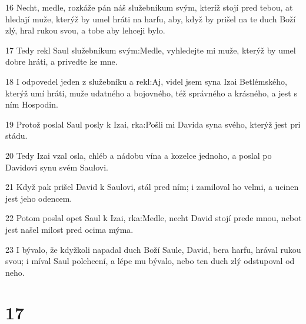 \par 16 Necht, medle, rozkáže pán náš služebníkum svým, kteríž stojí pred tebou, at hledají muže, kterýž by umel hráti na harfu, aby, když by prišel na te duch Boží zlý, hral rukou svou, a tobe aby lehceji bylo.
\par 17 Tedy rekl Saul služebníkum svým:Medle, vyhledejte mi muže, kterýž by umel dobre hráti, a privedte ke mne.
\par 18 I odpovedel jeden z služebníku a rekl:Aj, videl jsem syna Izai Betlémského, kterýž umí hráti, muže udatného a bojovného, též správného a krásného, a jest s ním Hospodin.
\par 19 Protož poslal Saul posly k Izai, rka:Pošli mi Davida syna svého, kterýž jest pri stádu.
\par 20 Tedy Izai vzal osla, chléb a nádobu vína a kozelce jednoho, a poslal po Davidovi synu svém Saulovi.
\par 21 Když pak prišel David k Saulovi, stál pred ním; i zamiloval ho velmi, a ucinen jest jeho odencem.
\par 22 Potom poslal opet Saul k Izai, rka:Medle, necht David stojí prede mnou, nebot jest našel milost pred ocima mýma.
\par 23 I bývalo, že kdyžkoli napadal duch Boží Saule, David, bera harfu, hrával rukou svou; i míval Saul polehcení, a lépe mu bývalo, nebo ten duch zlý odstupoval od neho.

\chapter{17}

